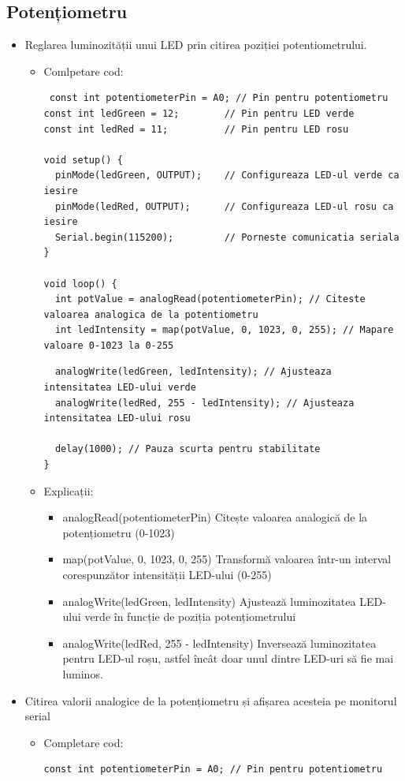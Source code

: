 \documentclass{report}
\begin{document}
\subsection{Potențiometru}
\begin{itemize}
    \item Reglarea luminozității unui LED prin citirea poziției potentiometrului.
        \begin{itemize}
            \item Comlpetare cod:
                \begin{lstlisting}
 const int potentiometerPin = A0; // Pin pentru potentiometru
const int ledGreen = 12;        // Pin pentru LED verde
const int ledRed = 11;          // Pin pentru LED rosu

void setup() {
  pinMode(ledGreen, OUTPUT);    // Configureaza LED-ul verde ca iesire
  pinMode(ledRed, OUTPUT);      // Configureaza LED-ul rosu ca iesire
  Serial.begin(115200);         // Porneste comunicatia seriala
}

void loop() {
  int potValue = analogRead(potentiometerPin); // Citeste valoarea analogica de la potentiometru
  int ledIntensity = map(potValue, 0, 1023, 0, 255); // Mapare valoare 0-1023 la 0-255
  \end{lstlisting}
  \newpage
  \vspace*{1cm}
  \begin{lstlisting}
  analogWrite(ledGreen, ledIntensity); // Ajusteaza intensitatea LED-ului verde
  analogWrite(ledRed, 255 - ledIntensity); // Ajusteaza intensitatea LED-ului rosu

  delay(1000); // Pauza scurta pentru stabilitate
}

                \end{lstlisting}
                \item Explicații:
                    \begin{itemize}
                        \item analogRead(potentiometerPin)   Citește valoarea analogică de la potențiometru (0-1023)
                        \item map(potValue, 0, 1023, 0, 255)   Transformă valoarea într-un interval corespunzător intensității LED-ului (0-255)
                        \item analogWrite(ledGreen, ledIntensity)   Ajustează luminozitatea LED-ului verde în funcție de poziția potențiometrului
                        \item analogWrite(ledRed, 255 - ledIntensity)   Inversează luminozitatea pentru LED-ul roșu, astfel încât doar unul dintre LED-uri să fie mai luminos.
                    \end{itemize}
        \end{itemize}
        \item  Citirea valorii analogice de la potențiometru și afișarea acesteia pe monitorul serial
            \begin{itemize}
                \item Completare cod:
                    \begin{lstlisting}
const int potentiometerPin = A0; // Pin pentru potentiometru


\end{lstlisting}
\end{itemize}
\end{itemize}
\end{document}

